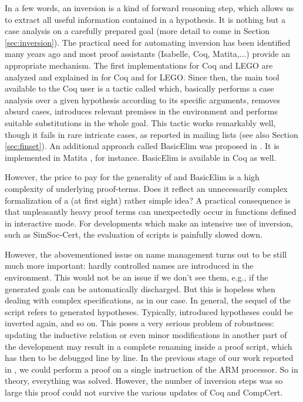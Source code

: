 In a few words, an inversion is a kind of forward reasoning step,
which allows us to extract all useful information contained in a
hypothesis. 
It is nothing but a case analysis on a carefully prepared goal
(more detail to come in Section \ref{sec:inversion}).
%
The practical need for automating inversion has been identified
many years ago
and most proof assistants (Isabelle, Coq, Matita,...)
provide an appropriate mechanism.
The first implementations for Coq and LEGO
are analyzed and explained in
\cite{cornes95automating} for Coq
and \cite{McBride96} for LEGO.
Since then, the main tool available to the Coq user is
a tactic called \inversion which,
basically performs a case analysis over a given hypothesis
according to its specific arguments,
removes absurd cases,
introduces relevant premises in the environment
and performs suitable substitutions in the whole goal.
%
This tactic works remarkably well,
though it fails in rare intricate cases,
as reported in mailing lists (see also Section \ref{sec:finset}).
%
An additional approach called BasicElim was proposed in \cite{mcbride00}.
It is implemented in Matita \cite{ricciottiPhd}, for instance.
BasicElim is available in Coq as well.

However, the price to pay for the generality
of \inversion and BasicElim
is a high complexity of underlying proof-terms.
Does it reflect an unnecessarily complex formalization of a 
(at first sight) rather simple idea?
A practical consequence is that
unpleasantly heavy proof terms can unexpectedly occur in
functions defined in interactive mode.
For developments 
which make an intensive use of inversion,
such as SimSoc-Cert, 
the evaluation of scripts is painfully slowed down.

However, the abovementioned issue on name management
turns out to be still much more important:
hardly controlled names are introduced in the environment.
This would not be an issue if we don't see them, 
e.g., if the generated goals can be automatically discharged.
But this is hopeless when dealing with complex specifications,
as in our case.
In general, the sequel of the script refers to generated hypotheses.
Typically, introduced hypotheses could be inverted again, and so on.
This poses a very serious problem of robustness:
updating the inductive relation or
even minor modifications in another part of the development
may result in a complete renaming 
inside a proof script,
which has then to be debugged line by line.
%
In the previous stage of our work reported in \cite{cpp11}, 
we could perform a proof on a single instruction of the ARM processor.
So in theory, everything was solved.
However, the number of inversion steps was so large
this proof could not survive the various updates of Coq and CompCert.

